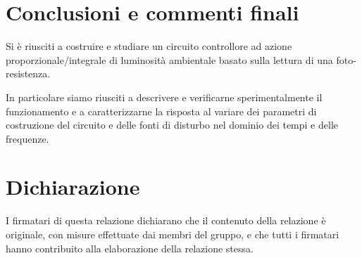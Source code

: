 \documentclass[10pt, a4paper, italian]{article}
\begin{document}
\section*{Conclusioni e commenti finali}
Si è riusciti a costruire e studiare un circuito controllore ad azione
proporzionale/integrale di luminosità ambientale basato sulla lettura di una
foto-resistenza.

In particolare siamo riusciti a descrivere e verificarne sperimentalmente il
funzionamento e a caratterizzarne la risposta al variare dei parametri di
costruzione del circuito e delle fonti di disturbo nel dominio dei tempi e
delle frequenze.

\section*{Dichiarazione}
I firmatari di questa relazione dichiarano che il contenuto della relazione \`e
originale, con misure effettuate dai membri del gruppo, e che tutti i firmatari
hanno contribuito alla elaborazione della relazione stessa.
\end{document}
